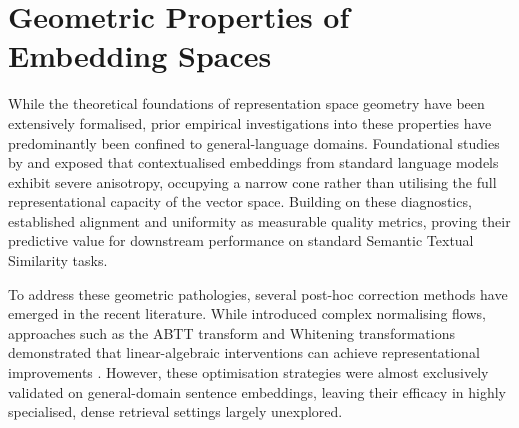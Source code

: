 \section{Geometric Properties of Embedding Spaces}

While the theoretical foundations of representation space geometry have been extensively formalised, prior empirical investigations into these properties have predominantly been confined to general-language domains. Foundational studies by \citet{ethayarajh-2019-contextual} and \citet{mu2018allbutthetop} exposed that contextualised embeddings from standard language models exhibit severe anisotropy, occupying a narrow cone rather than utilising the full representational capacity of the vector space. Building on these diagnostics, \citet{wang-isola-2020-contrastive} established alignment and uniformity as measurable quality metrics, proving their predictive value for downstream performance on standard Semantic Textual Similarity tasks.

To address these geometric pathologies, several post-hoc correction methods have emerged in the recent literature. While \citet{Li_2020_Sentence} introduced complex normalising flows, approaches such as the \ac{ABTT} transform \cite{mu2018allbutthetop} and Whitening transformations demonstrated that linear-algebraic interventions can achieve representational improvements \cite{su2021whitening}. However, these optimisation strategies were almost exclusively validated on general-domain sentence embeddings, leaving their efficacy in highly specialised, dense retrieval settings largely unexplored.
